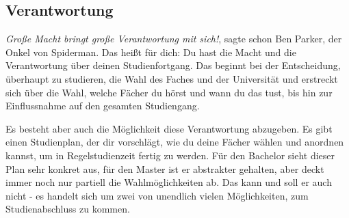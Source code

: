 \subsection{Verantwortung}
	\textit{Große Macht bringt große Verantwortung mit sich!}, sagte schon Ben Parker, der Onkel von Spiderman. Das heißt für dich: Du hast die Macht und die Verantwortung über deinen Studienfortgang. Das beginnt bei der Entscheidung, überhaupt zu studieren, die Wahl des Faches und der Universität und erstreckt sich über die Wahl, welche Fächer du hörst und wann du das tust, bis hin zur Einflussnahme auf den gesamten Studiengang.

	Es besteht aber auch die Möglichkeit diese Verantwortung abzugeben. Es gibt einen Studienplan, der dir vorschlägt, wie du deine Fächer wählen und anordnen kannst, um in Regelstudienzeit fertig zu werden. Für den Bachelor sieht dieser Plan sehr konkret aus, für den Master ist er abstrakter gehalten, aber deckt immer noch nur partiell die Wahlmöglichkeiten ab. Das kann und soll er auch nicht - es handelt sich um zwei von unendlich vielen Möglichkeiten, zum Studienabschluss zu kommen.